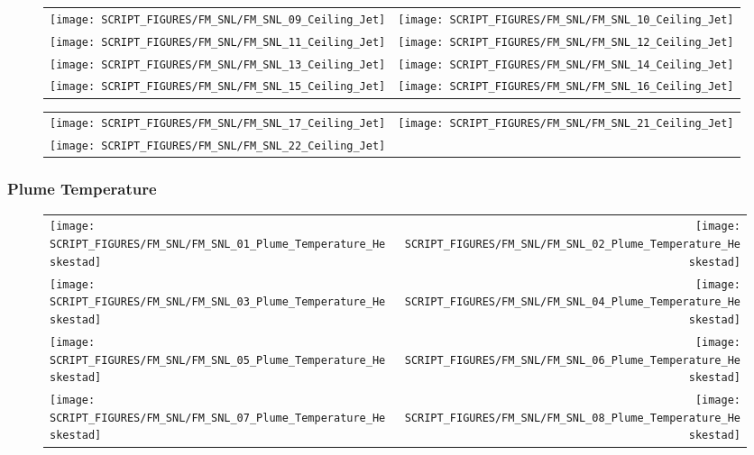 \begin{figure}[!ht]
\begin{tabular*}{\textwidth}{l@{\extracolsep{\fill}}r}
\texttt{[image: SCRIPT\_FIGURES/FM\_SNL/FM\_SNL\_09\_Ceiling\_Jet]} &
\texttt{[image: SCRIPT\_FIGURES/FM\_SNL/FM\_SNL\_10\_Ceiling\_Jet]} \\
\texttt{[image: SCRIPT\_FIGURES/FM\_SNL/FM\_SNL\_11\_Ceiling\_Jet]} &
\texttt{[image: SCRIPT\_FIGURES/FM\_SNL/FM\_SNL\_12\_Ceiling\_Jet]} \\
\texttt{[image: SCRIPT\_FIGURES/FM\_SNL/FM\_SNL\_13\_Ceiling\_Jet]} &
\texttt{[image: SCRIPT\_FIGURES/FM\_SNL/FM\_SNL\_14\_Ceiling\_Jet]} \\
\texttt{[image: SCRIPT\_FIGURES/FM\_SNL/FM\_SNL\_15\_Ceiling\_Jet]} &
\texttt{[image: SCRIPT\_FIGURES/FM\_SNL/FM\_SNL\_16\_Ceiling\_Jet]}
\end{tabular*}
\end{figure}

\begin{figure}[!ht]
\begin{tabular*}{\textwidth}{l@{\extracolsep{\fill}}r}
\texttt{[image: SCRIPT\_FIGURES/FM\_SNL/FM\_SNL\_17\_Ceiling\_Jet]} &
\texttt{[image: SCRIPT\_FIGURES/FM\_SNL/FM\_SNL\_21\_Ceiling\_Jet]} \\
\texttt{[image: SCRIPT\_FIGURES/FM\_SNL/FM\_SNL\_22\_Ceiling\_Jet]}
\end{tabular*}
\end{figure}

\clearpage

\subsubsection{Plume Temperature}

\begin{figure}[!ht]
\begin{tabular*}{\textwidth}{l@{\extracolsep{\fill}}r}
\texttt{[image: SCRIPT\_FIGURES/FM\_SNL/FM\_SNL\_01\_Plume\_Temperature\_Heskestad]} &
\texttt{[image: SCRIPT\_FIGURES/FM\_SNL/FM\_SNL\_02\_Plume\_Temperature\_Heskestad]} \\
\texttt{[image: SCRIPT\_FIGURES/FM\_SNL/FM\_SNL\_03\_Plume\_Temperature\_Heskestad]} &
\texttt{[image: SCRIPT\_FIGURES/FM\_SNL/FM\_SNL\_04\_Plume\_Temperature\_Heskestad]} \\
\texttt{[image: SCRIPT\_FIGURES/FM\_SNL/FM\_SNL\_05\_Plume\_Temperature\_Heskestad]} &
\texttt{[image: SCRIPT\_FIGURES/FM\_SNL/FM\_SNL\_06\_Plume\_Temperature\_Heskestad]} \\
\texttt{[image: SCRIPT\_FIGURES/FM\_SNL/FM\_SNL\_07\_Plume\_Temperature\_Heskestad]} &
\texttt{[image: SCRIPT\_FIGURES/FM\_SNL/FM\_SNL\_08\_Plume\_Temperature\_Heskestad]}
\end{tabular*}
\end{figure}

